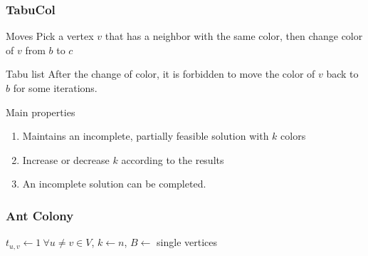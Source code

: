 \begin{frame}[fragile]
\frametitle{TabuCol}
\begin{block}{Moves}
Pick a vertex \(v\) that has a neighbor with the same color, then change color
of \(v\) from \(b\) to \(c\)
\end{block}

\begin{block}{Tabu list}
After the change of color, it is \alert{forbidden} to move the color of \(v\)
back to \(b\) for some iterations.
\end{block}

\begin{block}{Main properties}
\begin{enumerate}
\item
      Maintains an incomplete, partially feasible solution with \(k\) colors
\item
      Increase or decrease \(k\) according to the results
\item
      An incomplete solution can be completed.
\end{enumerate}
\end{block}
\end{frame}

\begin{frame}[fragile]
\frametitle{Ant Colony}
\begin{algorithm}[H]
\(t_{u,v}\gets 1 \ \forall u\neq v\in V\), \(k\gets n\), \(B\gets\) single
vertices
\end{algorithm}
\end{frame}






